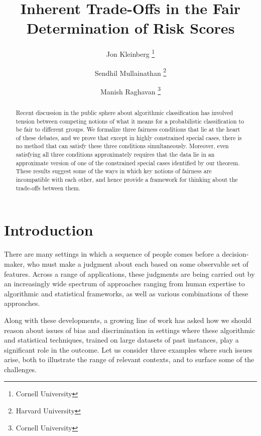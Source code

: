\documentclass[11pt]{article}
\begin{document}
\title{Inherent Trade-Offs in the Fair Determination of Risk Scores}

\date{}
\author{Jon Kleinberg
\thanks{Cornell University}
\and
Sendhil Mullainathan
\thanks{Harvard University}
\and
Manish Raghavan
\thanks{Cornell University}
}

\maketitle

\begin{abstract}
Recent discussion in the public sphere about algorithmic classification
has involved tension between competing notions of what it means
for a probabilistic classification to be fair to different groups.  
We formalize three fairness conditions that lie at the heart of these
debates, and we prove that except in highly constrained special cases,
there is no method that can satisfy these three conditions simultaneously.
Moreover, even satisfying all three conditions approximately requires 
that the data lie in an approximate version of one of the constrained 
special cases identified by our theorem.
These results suggest some of the ways in which key notions of
fairness are incompatible with each other, and hence provide a
framework for thinking about the trade-offs between them.
\end{abstract}


\section{Introduction}

There are many settings in which a sequence of people comes before
a decision-maker, who must make a judgment about each based on 
some observable set of features.
Across a range of applications, these judgments are being carried out
by an increasingly wide spectrum of approaches ranging from human
expertise to algorithmic and statistical frameworks, as well as various
combinations of these approaches.

Along with these developments, 
a growing line of work has asked 
how we should reason about issues of bias and discrimination 
in settings where these algorithmic and statistical techniques, trained
on large datasets of past instances, play a significant role in the outcome.
Let us consider three examples where such issues arise, both to illustrate
the range of relevant contexts, and to surface
some of the challenges.
\end{document}
